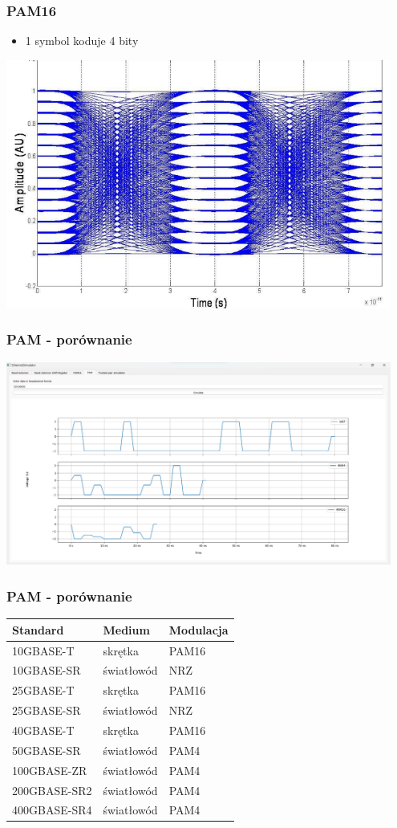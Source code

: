 \documentclass{beamer}
\begin{document}
\begin{frame}
\frametitle{PAM16}
\begin{itemize}
    \item 1 symbol koduje 4 bity
\end{itemize}
\includegraphics[width=0.95\textwidth]{images/eye_diagram_pam16.png}
\end{frame}

\begin{frame}
\frametitle{PAM - porównanie}
\includegraphics[width=0.95\textwidth]{images/prezentacja_pam.png}
\end{frame}

\begin{frame}
\frametitle{PAM - porównanie}
\begin{table}[h]
\centering
    \begin{tabular}{m{3cm} m{3cm} m{3cm}}
    \toprule
    Standard & Medium & Modulacja \\
    \midrule
    10GBASE-T & skrętka & PAM16 \\
    \midrule
    10GBASE-SR & światłowód & NRZ \\
    \midrule
    25GBASE-T & skrętka & PAM16 \\
    \midrule
    25GBASE-SR & światłowód & NRZ \\
    \midrule
    40GBASE-T & skrętka & PAM16 \\
    \midrule
    50GBASE-SR & światłowód & PAM4 \\
    \midrule
    100GBASE-ZR & światłowód & PAM4 \\
    \midrule
    200GBASE-SR2 & światłowód & PAM4 \\
    \midrule
    400GBASE-SR4 & światłowód & PAM4 \\
    \bottomrule
    \end{tabular}
\end{table}
\end{frame}
\end{document}
